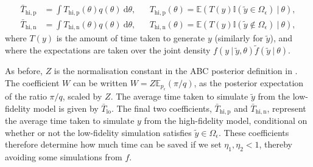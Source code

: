 \documentclass[review,demo]{siamonline190516}
\begin{document}
\begin{lemma}
\begin{subequations}
\begin{align}
\bar T_{\mathrm{hi,p}} &= \int T_{\mathrm{hi,p}}(\theta) q(\theta) ~\mathrm d\theta
,&
&T_{\mathrm{hi,p}}(\theta) = \mathbb E\left( T(y) \mathbb I(\tilde y \in \Omega_\epsilon) ~|~ \theta \right)
,\\
\bar T_{\mathrm{hi,n}} &= \int T_{\mathrm{hi,n}}(\theta) q(\theta) ~\mathrm d\theta
,&
&T_{\mathrm{hi,n}}(\theta) = \mathbb E\left( T(y) \mathbb I(\tilde y \notin \Omega_\epsilon) ~|~ \theta \right)
,
\end{align}
\end{subequations}
where $T(y)$ is the amount of time taken to generate $y$ (similarly for $\tilde y$), and where the expectations are taken over the joint density $f(y~|~\tilde y, \theta) \tilde f(\tilde y~|~\theta)$.
\end{lemma}

As before, $Z$ is the normalisation constant in the ABC posterior definition in .
The coefficient $W$ can be written $W = Z \mathbb E_{p_\epsilon}(\pi/q)$, as the posterior expectation of the ratio $\pi / q$, scaled by $Z$.
The average time taken to simulate $\tilde y$ from the low-fidelity model is given by $\bar T_{\mathrm{lo}}$.
The final two coefficients, $\bar T_{\mathrm{hi,p}}$ and $\bar T_{\mathrm{hi,n}}$, represent the average time taken to simulate $y$ from the high-fidelity model, conditional on whether or not the low-fidelity simulation satisfies $\tilde y \in \Omega_\epsilon$.
These coefficients therefore determine how much time can be saved if we set $\eta_1,\eta_2 < 1$, thereby avoiding some simulations from $f$.
\end{document}
